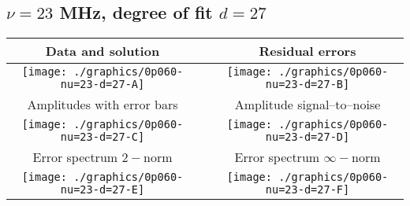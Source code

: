 

% 

\clearpage{}
\break{}

\subsection{$\nu = 23$ MHz, degree of fit $d = 27$}

\begin{table}[h]
    \begin{center}
        \begin{tabular}{ccc}
            Data and solution & \quad & Residual errors \\\hline
            \texttt{[image: ./graphics/0p060-nu=23-d=27-A]} &&
            \texttt{[image: ./graphics/0p060-nu=23-d=27-B]} \\[15pt]
            Amplitudes with error bars && Amplitude signal--to--noise \\\hline
            \texttt{[image: ./graphics/0p060-nu=23-d=27-C]} &&
            \texttt{[image: ./graphics/0p060-nu=23-d=27-D]} \\[15pt]
            Error spectrum $2-$norm && Error spectrum $\infty-$norm \\\hline
            \texttt{[image: ./graphics/0p060-nu=23-d=27-E]} &&
            \texttt{[image: ./graphics/0p060-nu=23-d=27-F]} \\[15pt]
        \end{tabular}
    \end{center}
\label{fig:elev=60, nu=23}
\end{table}



\endinput
